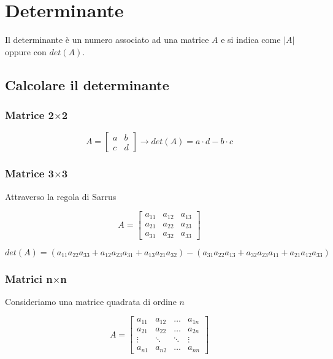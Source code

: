 \section{Determinante}

\begin{definition}
Il determinante è un numero associato ad una matrice $A$ e si indica come $|A|$ oppure con $det(A)$.
\end{definition}

\subsection{Calcolare il determinante}

\subsubsection{Matrice 2$\times$2}

$$A=\left[\begin{matrix}a & b\\ c & d\end{matrix}\right] \rightarrow det(A) = a \cdot d - b \cdot c$$

\subsubsection{Matrice 3$\times$3}

Attraverso la regola di Sarrus

$$A=\left[\begin{matrix}a_{11} & a_{12} & a_{13}\\ a_{21} & a_{22} & a_{23}\\ a_{31} & a_{32} & a_{33}\end{matrix}\right]$$

$$det(A)=(a_{11}a_{22}a_{33}+a_{12}a_{23}a_{31}+a_{13}a_{21}a_{32})-(a_{31}a_{22}a_{13}+a_{32}a_{23}a_{11}+a_{21}a_{12}a_{33})$$

\subsubsection{Matrici n$\times$n}

Consideriamo una matrice quadrata di ordine $n$

$$A=\left[\begin{matrix} a_{11} & a_{12}& \dots& a_{1n} \\ a_{21} & a_{22}& \dots &a_{2n}\\ \vdots & \ddots &\ddots & \vdots\\ a_{n1}& a_{n2} & \dots & a_{nn} \end{matrix}\right]$$

